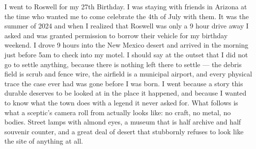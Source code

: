 I went to Roswell for my 27th Birthday. I was staying with friends in Arizona at the time who wanted me to come celebrate the 4th of July with them. It was the summer of 2024 and when I realized that Roswell was only a 9 hour drive away I asked and was granted permission to borrow their vehicle for my birthday weekend. I drove 9 hours into the New Mexico desert and arrived in the morning just before 5am to check into my motel. I should say at the outset that I did not go to settle anything, because there is nothing left there to settle --- the debris field is scrub and fence wire, the airfield is a municipal airport, and every physical trace the case ever had was gone before I was born. I went because a story this durable deserves to be looked at in the place it happened, and because I wanted to know what the town does with a legend it never asked for. What follows is what a sceptic's camera roll from  actually looks like: no craft, no metal, no bodies. Street lamps with almond eyes, a museum that is half archive and half souvenir counter, and a great deal of desert that stubbornly refuses to look like the site of anything at all.
